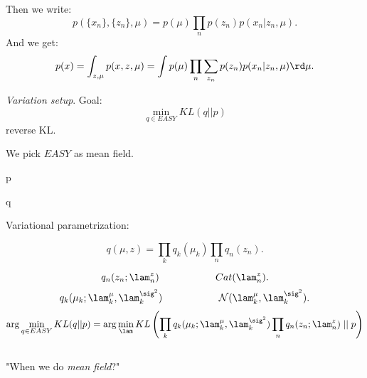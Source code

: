 \documentclass{article}
\begin{document}
Then we write:
\[ p(\{x_n\},\{z_n\},\mu) = p(\mu) \prod_n p(z_n) p(x_n|z_n,\mu). \]
And we get:
\[ p(x) = \int_{z,\mu} p(x,z,\mu) = \int p(\mu) \prod_n \sum_{z_n} p(z_n) p(x_n|z_n,\mu) \rd \mu. \]

{\em Variation setup}. 
Goal:\[ \min_{q\in EASY} KL(q||p) \] 
reverse KL.

We pick $EASY$ as mean field. 
\begin{center}
\end{center}
\begin{center}
p
\end{center}
 
\begin{center}
\end{center}

\begin{center}
q
\end{center}
Variational parametrization:

\[ q(\mu, z) = \prod_k q_k(\mu_k)\prod_n q_n(z_n). \]

\[ q_n(z_n;\lam_n^{z}) \hspace{2cm} Cat(\lam_n^z). \]
\[ q_k(\mu_k;\lam_k^{\mu}, \lam_k^{\sig^2}) \hspace{2cm} \mathcal{N}(\lam_k^{\mu}, \lam_k^{\sig^2}). \]
\[ \arg \min _{q\in EASY} KL(q||p) = \arg\min_\lam KL \left( \prod_k q_k(\mu_k;\lam_k^{\mu}, \lam_k^{\sig^2}) \prod_n q_n(z_n;\lam_n^{z})  \; || \;  p \right) \] \\ 



"When we do {\em mean field}?"
\end{document}
